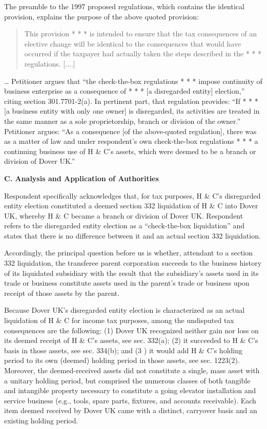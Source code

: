 \begin{select}
The preamble to the 1997 proposed regulations, which contains the identical provision, explains the purpose of the above
quoted provision:
\begin{quote}This provision * * * is intended to ensure that the tax consequences of an elective change will be identical to the
consequences that would have occurred if the taxpayer had actually taken the steps described in the * * * regulations.
[....]
\end{quote}
\ldots
Petitioner argues that ``the check-the-box regulations * * * impose continuity of business enterprise as a consequence of * * *
[a disregarded entity] election,'' citing section 301.7701-2(a). In pertinent part, that regulation provides: ``If * * * [a business
entity with only one owner] is disregarded, its activities are treated in the same manner as a sole proprietorship, branch or
division of the owner.''
Petitioner argues: ``As a consequence [of the above-quoted regulation], there was as a matter of law and under respondent's
own check-the-box regulations * * * a continuing business use of H \& C's assets, which were deemed to be a branch or
division of Dover UK.''
\begin{center}
\textbf{C. Analysis and Application of Authorities}\\
\end{center}
Respondent specifically acknowledges that, for tax purposes, H \& C's disregarded entity election constituted a deemed section 332 liquidation of H \& C into Dover UK, whereby H \& C became a branch or division of Dover UK. Respondent refers to the disregarded entity election as a ``check-the-box liquidation'' and states that there is no difference between it and an actual section 332 liquidation.

Accordingly, the principal question before us is whether, attendant to a section 332 liquidation, the transferee parent
corporation succeeds to the business history of its liquidated subsidiary with the result that the subsidiary's assets used in its
trade or business constitute assets used in the parent's trade or business upon receipt of those assets by the parent.

Because Dover UK's disregarded entity election is characterized as an actual liquidation of H \& C for income tax purposes,
among the undisputed tax consequences are the following: (1) Dover UK recognized neither gain nor loss on its deemed
receipt of H \& C's assets, see sec. 332(a); (2) it succeeded to H \& C's basis in those assets, see sec. 334(b); and (3 ) it would
add H \& C's holding period to its own (deemed) holding period in those assets, see sec. 1223(2). Moreover, the deemed-received assets did not constitute a single, mass asset with a unitary holding period, but comprised the numerous classes of both tangible and intangible property necessary to constitute a going elevator installation and service business (e.g., tools, spare parts, fixtures, and accounts receivable). Each item deemed received by Dover UK came with a distinct, carryover basis and an existing holding period.


\end{select}
